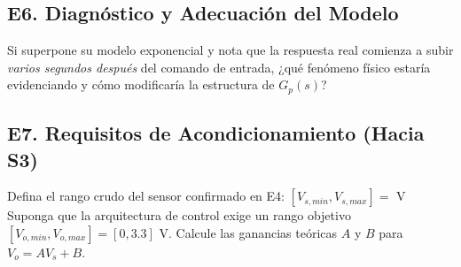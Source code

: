 \documentclass[11pt, a4paper]{article}
\begin{document}
\subsection*{E6. Diagnóstico y Adecuación del Modelo}
Si superpone su modelo exponencial y nota que la respuesta real comienza a subir \textit{varios segundos después} del comando de entrada, ¿qué fenómeno físico estaría evidenciando y cómo modificaría la estructura de $G_p(s)$? \vspace{2cm}

\subsection*{E7. Requisitos de Acondicionamiento (Hacia S3)}
Defina el rango crudo del sensor confirmado en E4: $[V_{s,min}, V_{s,max}] =$\hspace{2cm} V \\
Suponga que la arquitectura de control exige un rango objetivo $[V_{o,min}, V_{o,max}] = [0, 3.3]$ V. Calcule las ganancias teóricas $A$ y $B$ para $V_o = A V_s + B$. \vspace{2cm}
\end{document}
